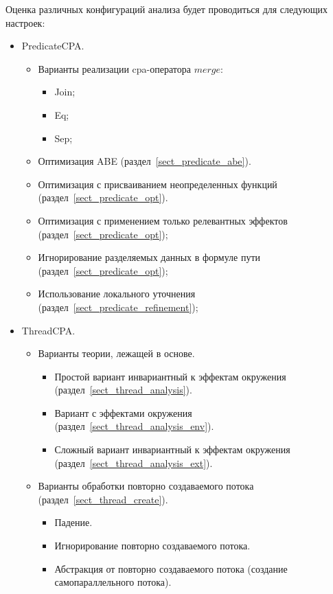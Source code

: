 Оценка различных конфигураций анализа будет проводиться для следующих настроек:
\begin{itemize}
\item PredicateCPA.
\begin{itemize}
\item Варианты реализации cpa-оператора $merge$:
\begin{itemize}
\item Join;
\item Eq;
\item Sep;
\end{itemize}
\item Оптимизация ABE (раздел~\ref{sect_predicate_abe}).
\item Оптимизация с присваиванием неопределенных функций (раздел~\ref{sect_predicate_opt}).
\item Оптимизация с применением только релевантных эффектов (раздел~\ref{sect_predicate_opt});
\item Игнорирование разделяемых данных в формуле пути (раздел~\ref{sect_predicate_opt});
\item Использование локального уточнения (раздел~\ref{sect_predicate_refinement});
\end{itemize}
\item ThreadCPA.
\begin{itemize}
\item Варианты теории, лежащей в основе.
\begin{itemize}
\item Простой вариант инвариантный к эффектам окружения (раздел~\ref{sect_thread_analysis}).
\item Вариант с эффектами окружения (раздел~\ref{sect_thread_analysis_env}).
\item Сложный вариант инвариантный к эффектам окружения (раздел~\ref{sect_thread_analysis_ext}).
\end{itemize}
\item Варианты обработки повторно создаваемого потока (раздел~\ref{sect_thread_create}).
\begin{itemize}
\item Падение.
\item Игнорирование повторно создаваемого потока.
\item Абстракция от повторно создаваемого потока (создание самопараллельного потока).
\end{itemize}
\end{itemize}

\end{itemize}
